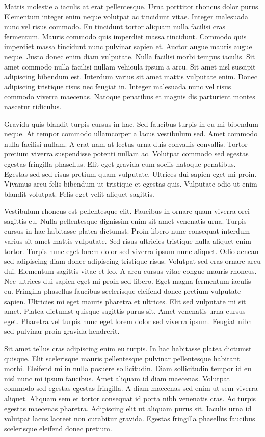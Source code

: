 \documentclass[11pt,a4paper]{article}
\begin{document}
Mattis molestie a iaculis at erat pellentesque. Urna porttitor rhoncus dolor purus. Elementum integer enim neque volutpat ac tincidunt vitae. Integer malesuada nunc vel risus commodo. Eu tincidunt tortor aliquam nulla facilisi cras fermentum. Mauris commodo quis imperdiet massa tincidunt. Commodo quis imperdiet massa tincidunt nunc pulvinar sapien et. Auctor augue mauris augue neque. Justo donec enim diam vulputate. Nulla facilisi morbi tempus iaculis. Sit amet commodo nulla facilisi nullam vehicula ipsum a arcu. Sit amet nisl suscipit adipiscing bibendum est. Interdum varius sit amet mattis vulputate enim. Donec adipiscing tristique risus nec feugiat in. Integer malesuada nunc vel risus commodo viverra maecenas. Natoque penatibus et magnis dis parturient montes nascetur ridiculus.

Gravida quis blandit turpis cursus in hac. Sed faucibus turpis in eu mi bibendum neque. At tempor commodo ullamcorper a lacus vestibulum sed. Amet commodo nulla facilisi nullam. A erat nam at lectus urna duis convallis convallis. Tortor pretium viverra suspendisse potenti nullam ac. Volutpat commodo sed egestas egestas fringilla phasellus. Elit eget gravida cum sociis natoque penatibus. Egestas sed sed risus pretium quam vulputate. Ultrices dui sapien eget mi proin. Vivamus arcu felis bibendum ut tristique et egestas quis. Vulputate odio ut enim blandit volutpat. Felis eget velit aliquet sagittis.

Vestibulum rhoncus est pellentesque elit. Faucibus in ornare quam viverra orci sagittis eu. Nulla pellentesque dignissim enim sit amet venenatis urna. Turpis cursus in hac habitasse platea dictumst. Proin libero nunc consequat interdum varius sit amet mattis vulputate. Sed risus ultricies tristique nulla aliquet enim tortor. Turpis nunc eget lorem dolor sed viverra ipsum nunc aliquet. Odio aenean sed adipiscing diam donec adipiscing tristique risus. Volutpat sed cras ornare arcu dui. Elementum sagittis vitae et leo. A arcu cursus vitae congue mauris rhoncus. Nec ultrices dui sapien eget mi proin sed libero. Eget magna fermentum iaculis eu. Fringilla phasellus faucibus scelerisque eleifend donec pretium vulputate sapien. Ultricies mi eget mauris pharetra et ultrices. Elit sed vulputate mi sit amet. Platea dictumst quisque sagittis purus sit. Amet venenatis urna cursus eget. Pharetra vel turpis nunc eget lorem dolor sed viverra ipsum. Feugiat nibh sed pulvinar proin gravida hendrerit.

Sit amet tellus cras adipiscing enim eu turpis. In hac habitasse platea dictumst quisque. Elit scelerisque mauris pellentesque pulvinar pellentesque habitant morbi. Eleifend mi in nulla posuere sollicitudin. Diam sollicitudin tempor id eu nisl nunc mi ipsum faucibus. Amet aliquam id diam maecenas. Volutpat commodo sed egestas egestas fringilla. A diam maecenas sed enim ut sem viverra aliquet. Aliquam sem et tortor consequat id porta nibh venenatis cras. Ac turpis egestas maecenas pharetra. Adipiscing elit ut aliquam purus sit. Iaculis urna id volutpat lacus laoreet non curabitur gravida. Egestas fringilla phasellus faucibus scelerisque eleifend donec pretium.
\end{document}
